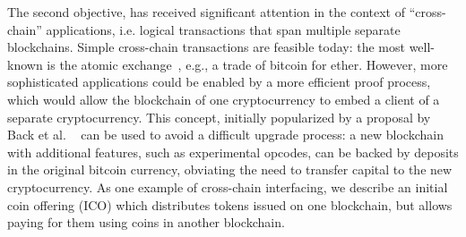 %
The second objective, has received  significant attention in the context of 
``cross-chain'' applications, i.e. logical transactions that span multiple
separate blockchains. Simple cross-chain transactions are feasible today: the
most well-known is the atomic exchange~\cite{tiernolan}, e.g., a trade of
bitcoin for ether. However, more sophisticated applications could be enabled 
by a more efficient proof process, which would allow the blockchain of one cryptocurrency to embed a
client of a separate cryptocurrency. This concept, initially popularized by a
proposal by Back et al. ~\cite{sidechains} 
can be used to avoid a difficult
upgrade process: a new blockchain with additional features, such as experimental
opcodes, can be backed by deposits in the original bitcoin currency, obviating
the need to transfer capital to the new cryptocurrency. As one example of
cross-chain interfacing, we describe an initial coin offering (ICO) which distributes tokens issued on
one blockchain, but allows paying for them using coins in another blockchain.


